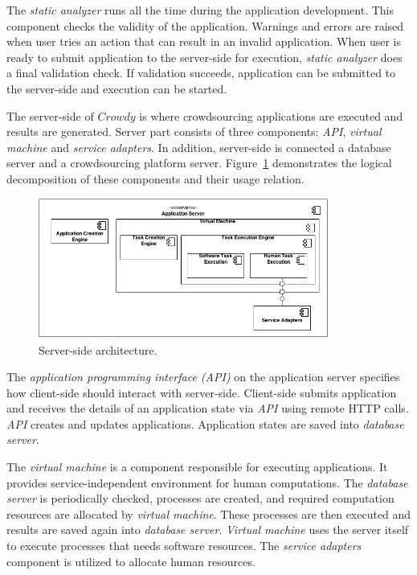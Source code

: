 The \textit{static analyzer} runs all the time during the application development. This 
component checks the validity of the application. Warnings and errors are raised 
when user tries an action that can result in an invalid application. When user is 
ready to submit application to the server-side for execution, \textit{static analyzer} 
does a final validation check. If validation succeeds, application can be submitted 
to the server-side and execution can be started.

The server-side of $Crowdy$ is where crowdsourcing applications are executed and 
results are generated. Server part consists of three components: \textit{API}, 
\textit{virtual machine} and \textit{service adapters}. In addition, server-side 
is connected a database server and a crowdsourcing platform server. 
Figure~\ref{fig:serverdecomposition} demonstrates the logical decomposition of these 
components and their usage relation.

\begin{figure}[ht]
	\centering
	\includegraphics[width=0.85\textwidth]{figures/architecture/CC3.png}
	\caption{Server-side architecture.}
	\label{fig:serverdecomposition}
\end{figure}

The \textit{application programming interface (API)} on the application server 
specifies how client-side should interact with server-side. Client-side submits 
application and receives the details of an application state via \textit{API} using 
remote HTTP calls. \textit{API} creates and updates applications. Application 
states are saved into \textit{database server}.

The \textit{virtual machine} is a component responsible for executing applications. 
It provides service-independent environment for human computations. The 
\textit{database server} is periodically checked, processes are created, and 
required computation resources are allocated by \textit{virtual machine}. These 
processes are then executed and results are saved again into \textit{database server}. 
\textit{Virtual machine} uses the server itself to execute processes that needs 
software resources. The \textit{service adapters} component is utilized to allocate 
human resources.

